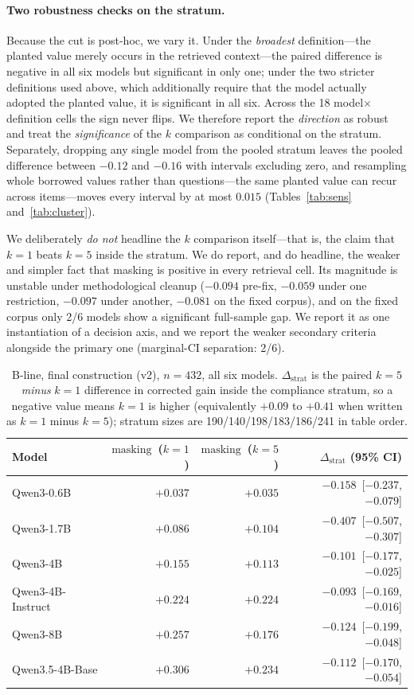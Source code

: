 \documentclass[11pt]{article}
\newcommand{\mask}{\ensuremath{\mathrm{masking}}}
\begin{document}
\paragraph{Two robustness checks on the stratum.} Because the cut is post-hoc, we vary it.
Under the \emph{broadest} definition---the planted value merely occurs in the retrieved
context---the paired difference is negative in all six models but significant in only one;
under the two stricter definitions used above, which additionally require that the model
actually adopted the planted value, it is significant in all six. Across the 18
model$\times$definition cells the sign never flips. We therefore report the
\emph{direction} as robust and treat the \emph{significance} of the $k$ comparison as
conditional on the stratum. Separately, dropping any single model from the pooled stratum
leaves the pooled difference between $-0.12$ and $-0.16$ with intervals excluding zero, and
resampling whole borrowed values rather than questions---the same planted value can recur
across items---moves every interval by at most $0.015$
(Tables~\ref{tab:sens} and~\ref{tab:cluster}).

We deliberately \emph{do not} headline the $k$ comparison itself---that is, the claim that
$k{=}1$ beats $k{=}5$ inside the stratum. We do report, and do headline, the weaker and
simpler fact that masking is positive in every retrieval cell. Its magnitude is unstable under
methodological cleanup ($-0.094$ pre-fix, $-0.059$ under one restriction, $-0.097$ under
another, $-0.081$ on the fixed corpus), and on the fixed corpus only 2/6 models show a
significant full-sample gap. We report it as one instantiation of a decision axis, and we
report the weaker secondary criteria alongside the primary one (marginal-CI separation:
2/6).

\begin{table}[t]\centering\small
\caption{B-line, final construction (v2), $n{=}432$, all six models. $\Delta_{\text{strat}}$
is the paired $k{=}5$ \emph{minus} $k{=}1$ difference in corrected gain inside the
compliance stratum, so a negative value means $k{=}1$ is higher
(equivalently $+0.09$ to $+0.41$ when written as $k{=}1$ minus $k{=}5$); stratum sizes are
190/140/198/183/186/241 in table order.}
\label{tab:bline}
\begin{tabular}{lrrr}
\toprule
Model & \mask\ ($k{=}1$) & \mask\ ($k{=}5$) & $\Delta_{\text{strat}}$ (95\% CI) \\
\midrule
Qwen3-0.6B        & $+0.037$ & $+0.035$ & $-0.158$ \,[$-0.237$, $-0.079$] \\
Qwen3-1.7B        & $+0.086$ & $+0.104$ & $-0.407$ \,[$-0.507$, $-0.307$] \\
Qwen3-4B          & $+0.155$ & $+0.113$ & $-0.101$ \,[$-0.177$, $-0.025$] \\
Qwen3-4B-Instruct & $+0.224$ & $+0.224$ & $-0.093$ \,[$-0.169$, $-0.016$] \\
Qwen3-8B          & $+0.257$ & $+0.176$ & $-0.124$ \,[$-0.199$, $-0.048$] \\
Qwen3.5-4B-Base   & $\mathbf{+0.306}$ & $+0.234$ & $-0.112$ \,[$-0.170$, $-0.054$] \\
\bottomrule
\end{tabular}
\end{table}
\end{document}
